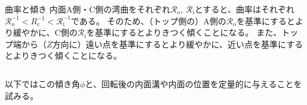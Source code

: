 \begin{Column}{曲率と傾き}
内面A側・C側の湾曲をそれぞれ$\mathcal R_\mathrm o$, $\mathcal R_\mathrm i$とすると、曲率はそれぞれ$\mathcal R_\mathrm o^{-1} < R_\mathrm c^{-1} < \mathcal R_\mathrm i^{-1}$である。
そのため、（トップ側の）A側の$\mathcal R_\mathrm o$を基準にするとより緩やかに、C側の$\mathcal R_\mathrm i$を基準にするとよりきつく傾くことになる。
また、トップ端から（$Z$方向に）遠い点を基準にするとより緩やかに、近い点を基準にするとよりきつく傾くことになる。
\end{Column}

以下ではこの傾き角$\phi$と、回転後の内面溝や内面の位置を定量的に与えることを試みる。




